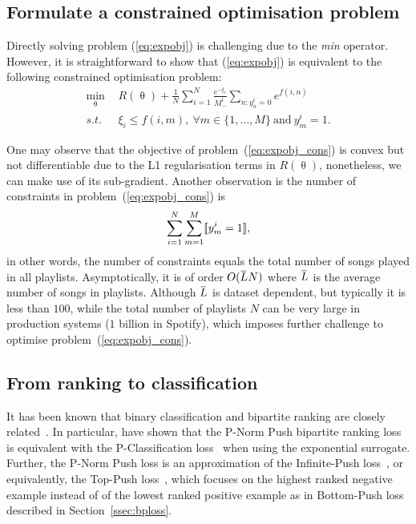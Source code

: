 \subsection{Formulate a constrained optimisation problem}

Directly solving problem (\ref{eq:expobj}) is challenging due to the \emph{min} operator.
However, it is straightforward to show that (\ref{eq:expobj}) is equivalent to the following constrained optimisation problem:
\begin{equation}
\label{eq:expobj_cons}
\begin{aligned}
\min_{\uptheta} \ \, & R(\uptheta) + \frac{1}{N} \sum_{i=1}^N \frac{e^{-\xi_i}}{M_-^i} \sum_{n: y_n^i = 0} e^{f(i, n)} \\
s.t. \ \, & \xi_i \le f(i, m), \ \forall m \in \{1,\dots,M\} \ \text{and} \ y_m^i = 1.
\end{aligned}
\end{equation}

One may observe that the objective of problem~(\ref{eq:expobj_cons}) is convex but not differentiable due to the L1 regularisation terms in $R(\uptheta)$,
nonetheless, we can make use of its sub-gradient.
Another observation is the number of constraints in problem~(\ref{eq:expobj_cons}) is 
$$
\sum_{i=1}^N \sum_{m=1}^M \llbracket y_m^i = 1 \rrbracket,
$$
in other words, the number of constraints equals the total number of songs played in all playlists.
Asymptotically, it is of order $O(\widebar{L} N)$ where $\widebar{L}$ is the average number of songs in playlists.
Although $\widebar{L}$ is dataset dependent, but typically it is less than $100$, 
while the total number of playlists $N$ can be very large in production systems (\eg $1$ billion in Spotify),
which imposes further challenge to optimise problem~(\ref{eq:expobj_cons}).



\subsection{From ranking to classification}

It has been known that binary classification and bipartite ranking are
closely related~\cite{ertekin2011equivalence,menon2016bipartite}.
In particular, \citet{ertekin2011equivalence} have shown that the P-Norm Push bipartite ranking loss~\cite{rudin2009p}
is equivalent with the P-Classification loss~\cite{ertekin2011equivalence} when using the exponential surrogate.
Further, the P-Norm Push loss is an approximation of the Infinite-Push loss~\cite{agarwal2011infinite},
or equivalently, the Top-Push loss~\cite{li2014top}, which focuses on the highest ranked negative example instead of
of the lowest ranked positive example as in Bottom-Push loss described in Section~\ref{ssec:bploss}.

